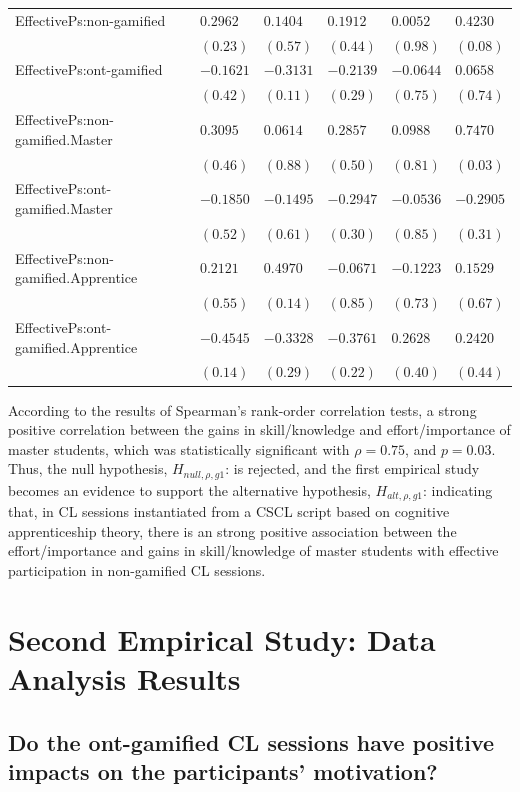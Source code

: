 {\begin{longtable}{lR{1.5cm}R{1.5cm}R{1.5cm}R{1.5cm}R{1.5cm}}
EffectivePs:non-gamified&$ 0.2962$&$ 0.1404$&$ 0.1912$&$ 0.0052$&$0.4230$\tabularnewline
 &$(0.23)$&$(0.57)$&$(0.44)$&$(0.98)$&$(0.08)$\tabularnewline
EffectivePs:ont-gamified&$-0.1621$&$-0.3131$&$-0.2139$&$-0.0644$&$ 0.0658$\tabularnewline
 &$(0.42)$&$(0.11)$&$(0.29)$&$(0.75)$&$(0.74)$\tabularnewline
EffectivePs:non-gamified.Master&$ 0.3095$&$ 0.0614$&$ 0.2857$&$ 0.0988$&$0.7470$\tabularnewline
 &$(0.46)$&$(0.88)$&$(0.50)$&$(0.81)$&$(0.03)$\tabularnewline
EffectivePs:ont-gamified.Master&$-0.1850$&$-0.1495$&$-0.2947$&$-0.0536$&$-0.2905$\tabularnewline
 &$(0.52)$&$(0.61)$&$(0.30)$&$(0.85)$&$(0.31)$\tabularnewline
EffectivePs:non-gamified.Apprentice&$ 0.2121$&$ 0.4970$&$-0.0671$&$-0.1223$&$ 0.1529$\tabularnewline
 &$(0.55)$&$(0.14)$&$(0.85)$&$(0.73)$&$(0.67)$\tabularnewline
EffectivePs:ont-gamified.Apprentice&$-0.4545$&$-0.3328$&$-0.3761$&$ 0.2628$&$ 0.2420$\tabularnewline
 &$(0.14)$&$(0.29)$&$(0.22)$&$(0.40)$&$(0.44)$\tabularnewline
\hline
\end{longtable}}%

According to the results of Spearman's rank-order correlation tests, a strong positive correlation between the gains in skill/knowledge and effort/importance of master students, which was statistically significant with $\rho = 0.75$, and $p = 0.03$.
Thus, the null hypothesis, $H_{null,\rho,g1}$:  is rejected, and the first empirical study becomes an evidence to support the alternative hypothesis, $H_{alt,\rho,g1}$:
 indicating that, in CL sessions instantiated from a CSCL script based on cognitive apprenticeship theory, there is an strong positive association between the effort/importance and gains in skill/knowledge of master students with effective participation in non-gamified CL sessions.

\section{Second Empirical Study: Data Analysis Results}
\label{sec:second-study}

\subsection*{Do the ont-gamified CL sessions have positive impacts on the participants' motivation?}

